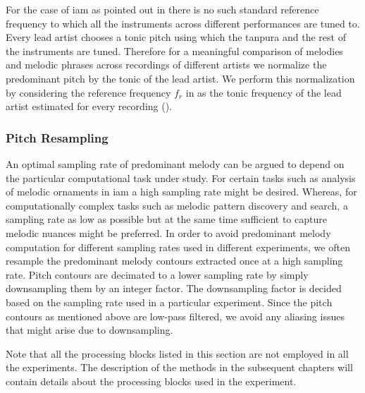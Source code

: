 {For the case of \gls{iam} as pointed out in  there is no such standard reference frequency to which all the instruments across different performances are tuned to. Every lead artist chooses a tonic pitch using which the \gls{tanpura} and the rest of the instruments are tuned. Therefore for a meaningful comparison of melodies and melodic phrases across recordings of different artists we normalize the predominant pitch by the tonic of the lead artist. We perform this normalization by considering the reference frequency $f_r$ in  as the tonic frequency of the lead artist estimated for every recording ().  


\subsubsection{Pitch Resampling}
\label{sec:data_processing_pitch_resampling}

An optimal sampling rate of predominant melody can be argued to depend on the particular computational task under study. For certain tasks such as analysis of melodic ornaments in \gls{iam} a high sampling rate might be desired. Whereas, for computationally complex tasks such as melodic pattern discovery and search, a sampling rate as low as possible but at the same time sufficient to capture melodic nuances might be preferred. In order to avoid predominant melody computation for different sampling rates used in different experiments, we often resample the predominant melody contours extracted once at a high sampling rate. Pitch contours are decimated to a lower sampling rate by simply downsampling them by an integer factor. The downsampling factor is decided based on the sampling rate used in a particular experiment. Since the pitch contours as mentioned above are low-pass filtered, we avoid any aliasing issues that might arise due to downsampling. 

Note that all the processing blocks listed in this section are not employed in all the experiments. The description of the methods in the subsequent chapters will contain details about the processing blocks used in the experiment. 

\section{}
\label{sec:pre_processing_nyas_segmentation}

}
